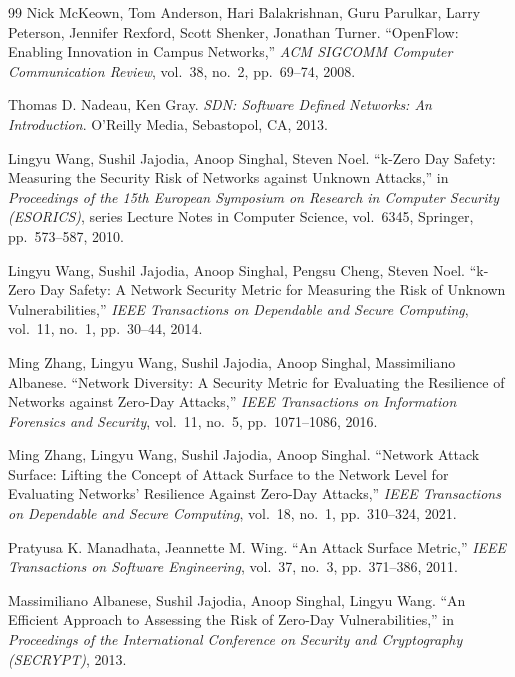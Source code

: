 \begingroup
\small
\begin{thebibliography}{99}
 Nick McKeown, Tom Anderson, Hari Balakrishnan, Guru Parulkar, Larry Peterson, Jennifer Rexford, Scott Shenker, Jonathan Turner. ``{OpenFlow}: Enabling Innovation in Campus Networks,'' \emph{ACM SIGCOMM Computer Communication Review}, vol.~38, no.~2, pp.~69--74, 2008.

 Thomas D. Nadeau, Ken Gray. \emph{{SDN}: Software Defined Networks: An Introduction}. O'Reilly Media, Sebastopol, CA, 2013.

 Lingyu Wang, Sushil Jajodia, Anoop Singhal, Steven Noel. ``{k-Zero Day Safety}: Measuring the Security Risk of Networks against Unknown Attacks,'' in \emph{Proceedings of the 15th European Symposium on Research in Computer Security (ESORICS)}, series Lecture Notes in Computer Science, vol.~6345, Springer, pp.~573--587, 2010.

 Lingyu Wang, Sushil Jajodia, Anoop Singhal, Pengsu Cheng, Steven Noel. ``{k-Zero Day Safety}: A Network Security Metric for Measuring the Risk of Unknown Vulnerabilities,'' \emph{IEEE Transactions on Dependable and Secure Computing}, vol.~11, no.~1, pp.~30--44, 2014.

 Ming Zhang, Lingyu Wang, Sushil Jajodia, Anoop Singhal, Massimiliano Albanese. ``Network Diversity: A Security Metric for Evaluating the Resilience of Networks against Zero-Day Attacks,'' \emph{IEEE Transactions on Information Forensics and Security}, vol.~11, no.~5, pp.~1071--1086, 2016.

 Ming Zhang, Lingyu Wang, Sushil Jajodia, Anoop Singhal. ``Network Attack Surface: Lifting the Concept of Attack Surface to the Network Level for Evaluating Networks' Resilience Against Zero-Day Attacks,'' \emph{IEEE Transactions on Dependable and Secure Computing}, vol.~18, no.~1, pp.~310--324, 2021.

 Pratyusa K. Manadhata, Jeannette M. Wing. ``An Attack Surface Metric,'' \emph{IEEE Transactions on Software Engineering}, vol.~37, no.~3, pp.~371--386, 2011.

 Massimiliano Albanese, Sushil Jajodia, Anoop Singhal, Lingyu Wang. ``An Efficient Approach to Assessing the Risk of Zero-Day Vulnerabilities,'' in \emph{Proceedings of the International Conference on Security and Cryptography (SECRYPT)}, 2013.


\end{thebibliography}
